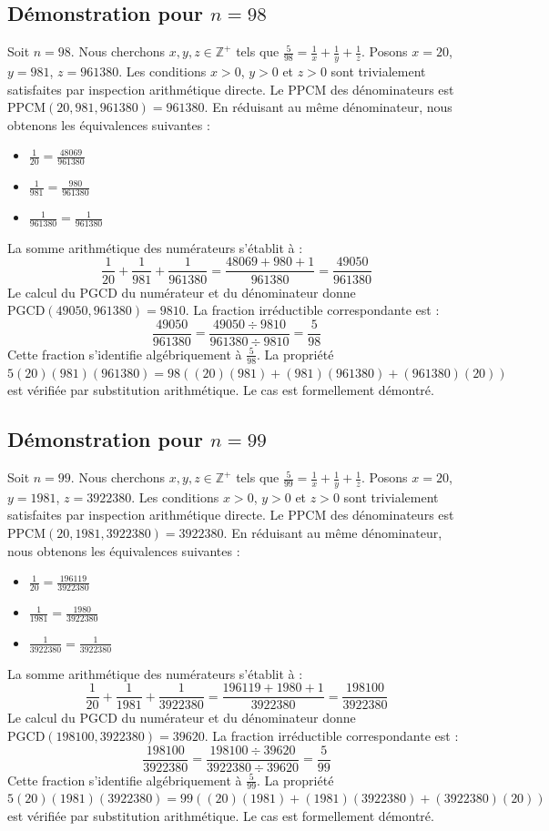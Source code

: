 \documentclass[12pt,a4paper]{article}
\begin{document}
\subsection{Démonstration pour $n = 98$}
Soit $n = 98$. Nous cherchons $x, y, z \in \mathbb{Z}^{+}$ tels que $\frac{5}{98} = \frac{1}{x} + \frac{1}{y} + \frac{1}{z}$.
Posons $x = 20$, $y = 981$, $z = 961380$.
Les conditions $x > 0$, $y > 0$ et $z > 0$ sont trivialement satisfaites par inspection arithmétique directe.
Le PPCM des dénominateurs est $\text{PPCM}(20, 981, 961380) = 961380$.
En réduisant au même dénominateur, nous obtenons les équivalences suivantes :
\begin{itemize}
    \item $\frac{1}{20} = \frac{48069}{961380}$
    \item $\frac{1}{981} = \frac{980}{961380}$
    \item $\frac{1}{961380} = \frac{1}{961380}$
\end{itemize}
La somme arithmétique des numérateurs s'établit à :
$$ \frac{1}{20} + \frac{1}{981} + \frac{1}{961380} = \frac{48069 + 980 + 1}{961380} = \frac{49050}{961380} $$
Le calcul du PGCD du numérateur et du dénominateur donne $\text{PGCD}(49050, 961380) = 9810$.
La fraction irréductible correspondante est :
$$ \frac{49050}{961380} = \frac{49050 \div 9810}{961380 \div 9810} = \frac{5}{98} $$
Cette fraction s'identifie algébriquement à $\frac{5}{98}$.
La propriété $5(20)(981)(961380) = 98((20)(981) + (981)(961380) + (961380)(20))$ est vérifiée par substitution arithmétique.
Le cas est formellement démontré.

\subsection{Démonstration pour $n = 99$}
Soit $n = 99$. Nous cherchons $x, y, z \in \mathbb{Z}^{+}$ tels que $\frac{5}{99} = \frac{1}{x} + \frac{1}{y} + \frac{1}{z}$.
Posons $x = 20$, $y = 1981$, $z = 3922380$.
Les conditions $x > 0$, $y > 0$ et $z > 0$ sont trivialement satisfaites par inspection arithmétique directe.
Le PPCM des dénominateurs est $\text{PPCM}(20, 1981, 3922380) = 3922380$.
En réduisant au même dénominateur, nous obtenons les équivalences suivantes :
\begin{itemize}
    \item $\frac{1}{20} = \frac{196119}{3922380}$
    \item $\frac{1}{1981} = \frac{1980}{3922380}$
    \item $\frac{1}{3922380} = \frac{1}{3922380}$
\end{itemize}
La somme arithmétique des numérateurs s'établit à :
$$ \frac{1}{20} + \frac{1}{1981} + \frac{1}{3922380} = \frac{196119 + 1980 + 1}{3922380} = \frac{198100}{3922380} $$
Le calcul du PGCD du numérateur et du dénominateur donne $\text{PGCD}(198100, 3922380) = 39620$.
La fraction irréductible correspondante est :
$$ \frac{198100}{3922380} = \frac{198100 \div 39620}{3922380 \div 39620} = \frac{5}{99} $$
Cette fraction s'identifie algébriquement à $\frac{5}{99}$.
La propriété $5(20)(1981)(3922380) = 99((20)(1981) + (1981)(3922380) + (3922380)(20))$ est vérifiée par substitution arithmétique.
Le cas est formellement démontré.
\end{document}
